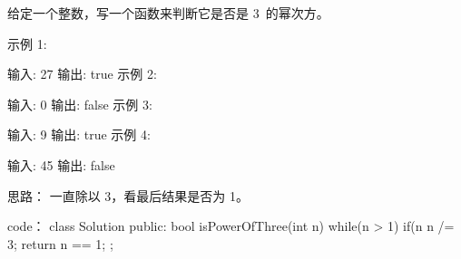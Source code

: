 给定一个整数，写一个函数来判断它是否是 3 的幂次方。

示例 1:

输入: 27
输出: true
示例 2:

输入: 0
输出: false
示例 3:

输入: 9
输出: true
示例 4:

输入: 45
输出: false



















思路：
一直除以 3，看最后结果是否为 1。
















code：
class Solution {
public:
    bool isPowerOfThree(int n) {
        while(n > 1)
        {
            if(n %
            n /= 3;
        }
        return n == 1;
    }
};